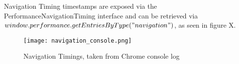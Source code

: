 
Navigation Timing timestamps are exposed via the PerformanceNavigationTiming interface and can be retrieved via $window.performance.getEntriesByType("navigation")$, as seen in figure X. %







\begin{figure}[h!]
\begin{center}
\texttt{[image: navigation\_console.png]}
\caption{Navigation Timings, taken from Chrome console log}
\label{img:navigation_console}
\end{center}
\end{figure}







